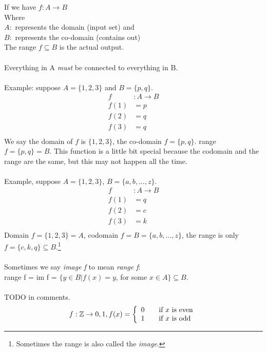 If we have $f:A \to B$ \\
Where \\
$A:$ represents the domain (input set) and \\
$B:$ represents the co-domain (contains out) \\
The range $f \subseteq B$ is the actual output. \\
\\
Everything in A \emph{must} be connected to everything in B.\\
\\
Example: suppose $A = \{1, 2, 3\}$ and $B = \{p,q\}$. \\
\begin{align}
  f & : A \to B \nonumber \\
  f(1) & = p \nonumber \\
  f(2) & = q \nonumber \\
  f(3) & = q \nonumber \\
\end{align}
We say the domain of $f$ is $\{1, 2, 3\}$, the co-domain $f=\{p,q\}$. range $f=\{p,q\}=B$.
This function is a little bit special because the codomain and the range are the same, but
this may not happen all the time.\\
\\
Example, suppose $A = \{1, 2, 3\}$, $B = \{a, b, \ldots, z\}$. \\
\begin{align}
  f & : A \to B \nonumber \\
  f(1) & = q \nonumber \\
  f(2) & = c \nonumber \\
  f(3) & = k \nonumber \\
\end{align}
Domain $f = \{1, 2, 3\} = A$, codomain $f = B = \{a,b,\ldots,z\}$, the range is only
$f = \{c, k, q\} \subseteq B$.\footnote{Sometimes the range is also called the \emph{image}.} \\
\\
Sometimes we say \emph{image f} to mean \emph{range f}: \\
range f = im f = $\{y \in B | f(x) = y$, for some $x \in A\} \subseteq B$. \\
\\
TODO in comments.\\
\begin{align}
  f: \mathbb{Z} \to {0,1}, f(x) =
    \left\{
      \begin{array}{l l}
        0 & \quad \text{if $x$ is even} \\
        1 & \quad \text{if $x$ is odd} \\
      \end{array}
    \right.
\end{align}
